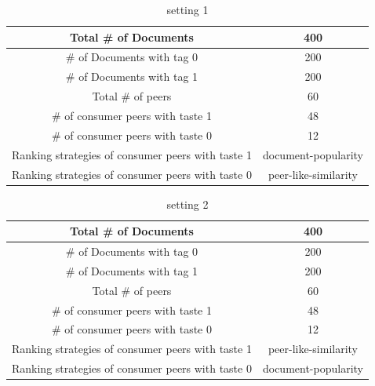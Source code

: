 \documentclass [12pt]{article} \usepackage{multicol}
\begin{document}
\begin{table}[h!]
\caption{setting 1}
\begin{center}


\begin{tabular}{|c|c|}
\hline

Total \# of Documents &  400  \\ \hline
\# of Documents with tag 0 &  200  \\ \hline
\# of Documents with tag 1 &  200  \\ \hline

Total \# of peers & 60 \\ \hline

\# of consumer peers with taste 1  & 48 \\ \hline 
\# of consumer peers with taste 0  &  12\\ \hline

Ranking strategies of consumer peers with taste 1  & document-popularity \\ \hline 
Ranking strategies of consumer peers with taste 0  &  peer-like-similarity\\ \hline


\end{tabular}

\end{center}
\label{default}
\end{table}



\begin{table}[h!]
\caption{setting 2}
\begin{center}


\begin{tabular}{|c|c|}
\hline

Total \# of Documents &  400  \\ \hline
\# of Documents with tag 0 &  200  \\ \hline
\# of Documents with tag 1 &  200  \\ \hline

Total \# of peers & 60 \\ \hline
\# of consumer peers with taste 1  &  48 \\ \hline 
\# of consumer peers with taste 0  &  12 \\ \hline

Ranking strategies of consumer peers with taste 1  & peer-like-similarity \\ \hline 
Ranking strategies of consumer peers with taste 0  &  document-popularity\\ \hline

\end{tabular}

\end{center}
\label{default}
\end{table}
\end{document}
